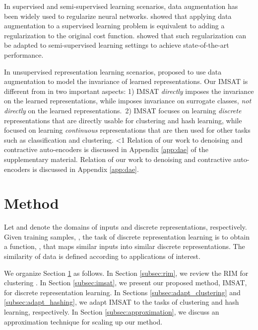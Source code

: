 \documentclass{article}
\theoremstyle{plain}
\newcounter{long}
\begin{document}
In supervised and semi-supervised learning scenarios, data augmentation has been widely used to regularize neural networks. \citet{leen1995data} showed that applying data augmentation to a supervised learning problem is equivalent to adding a regularization to the original cost function. 
\citet{bachman2014learning, miyato2015distributional, sajjadi2016regularization} showed that such regularization can be adapted to semi-supervised learning settings to achieve state-of-the-art performance. 

In unsupervised representation learning scenarios, \citet{dosovitskiy2014discriminative} proposed to use data augmentation to model the invariance of learned representations.
Our IMSAT is different from \citet{dosovitskiy2014discriminative} in two important aspects: 1) IMSAT \emph{directly} imposes the invariance on the learned representations, while \citet{dosovitskiy2014discriminative} imposes invariance on surrogate classes, \emph{not directly} on the learned representations.~2) IMSAT focuses on learning \emph{discrete} representations that are directly usable for clustering and hash learning, while \citet{dosovitskiy2014discriminative} focused on learning \emph{continuous} representations that are then used for other tasks such as classification and clustering.
\ifnum\value{long}<1
Relation of our work to denoising and contractive auto-encoders \citep{vincent2008extracting, rifai2011contractive} is discussed in Appendix \ref{app:dae} of the supplementary material. 
\else
Relation of our work to denoising and contractive auto-encoders \citep{vincent2008extracting, rifai2011contractive} is discussed in Appendix \ref{app:dae}. 
\fi


\section{Method}\label{sec:method}
Let  and  denote the domains of inputs and discrete representations, respectively. Given training samples, , the task of discrete representation learning is to obtain a function, , that maps similar inputs into similar discrete representations. The similarity of data is defined according to applications of interest.


We organize Section \ref{sec:method} as follows.
In Section \ref{subsec:rim}, we review the RIM for clustering \citep{krause2010discriminative}.  
In Section \ref{subsec:imsat}, we present our proposed method, IMSAT, for discrete representation learning.
In Sections \ref{subsec:adapt_clustering} and \ref{subsec:adapt_hashing}, we adapt IMSAT to the tasks of clustering and hash learning, respectively. 
In Section \ref{subsec:approximation}, we discuss an approximation technique for scaling up our method.
\end{document}
